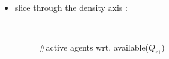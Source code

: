 \documentclass[a4paper,10pt]{article}
\begin{document}
\begin{itemize}
\item slice through the density axis : 
\begin{figure}[H]
\caption{\#active agents wrt. available($Q_{r1}$)}
\\

\end{figure}
\end{itemize}
\end{document}
